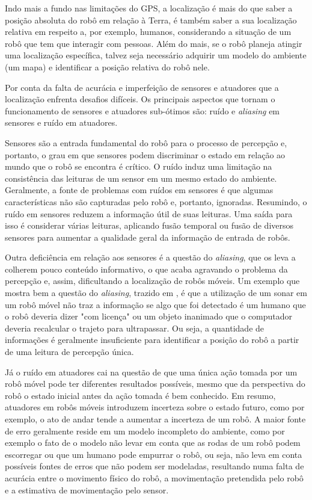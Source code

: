 \documentclass[acronym, symbols, table, deposito]{fei}
\begin{document}
			Indo mais a fundo nas limitações do GPS, a localização é mais do que saber a posição absoluta do robô em relação à Terra, é também saber a sua localização relativa em respeito a, por exemplo, humanos, considerando a situação de um robô que tem que interagir com pessoas. Além do mais, se o robô planeja atingir uma localização específica, talvez seja necessário adquirir um modelo do ambiente (um mapa) e identificar a posição relativa do robô nele. 
			
			Por conta da falta de acurácia e imperfeição de sensores e atuadores que a localização enfrenta desafios difíceis. Os principais aspectos que tornam o funcionamento de sensores e atuadores sub-ótimos são: ruído e \textit{aliasing} em sensores e ruído em atuadores.
			
			Sensores são a entrada fundamental do robô para o processo de percepção	e, portanto, o grau em que sensores podem discriminar o estado em relação ao mundo que o robô se encontra é crítico. O ruído induz uma limitação na consistência das leituras de um sensor em um mesmo estado do ambiente. Geralmente, a fonte de problemas com ruídos em sensores é que algumas características não são capturadas pelo robô e, portanto, ignoradas. Resumindo, o ruído em sensores reduzem a informação útil de suas leituras. Uma saída para isso é considerar várias leituras, aplicando fusão temporal ou fusão de diversos sensores para aumentar a qualidade geral da informação de entrada de robôs.
			
			Outra deficiência em relação aos sensores é a questão do \textit{aliasing}, que os leva a colherem pouco conteúdo informativo, o que acaba agravando o problema da percepção e, assim, dificultando a localização de robôs móveis. Um exemplo que mostra bem a questão do \textit{aliasing}, trazido em \textcite{siegwart2011introduction}, é que a utilização de um sonar em um robô móvel não traz a informação se algo que foi detectado é um humano que o robô deveria dizer "com licença" ou um objeto inanimado que o computador deveria recalcular o trajeto para ultrapassar. Ou seja, a quantidade de informações é geralmente insuficiente para identificar a posição do robô a partir de uma leitura de percepção única.
			
			Já o ruído em atuadores cai na questão de que uma única ação tomada por um robô móvel pode ter diferentes resultados possíveis, mesmo que da perspectiva do robô o estado inicial antes da ação tomada é bem conhecido. Em resumo, atuadores em robôs móveis introduzem incerteza sobre o estado futuro, como por exemplo, o ato de andar tende a aumentar a incerteza de um robô. A maior fonte de erro geralmente reside em um modelo incompleto do ambiente, como por exemplo o fato de o modelo não levar em conta que as rodas de um robô podem escorregar ou que um humano pode empurrar o robô, ou seja, não leva em conta possíveis fontes de erros que não podem ser modeladas, resultando numa falta de acurácia entre o movimento físico do robô, a movimentação pretendida pelo robô e a estimativa de movimentação pelo sensor.
		
\end{document}
